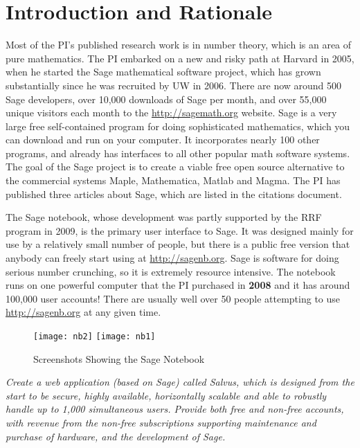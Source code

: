 \documentclass[11pt]{article}
\begin{document}
\section{Introduction and Rationale}


Most of the PI's published research work is in number theory, which is
an area of pure mathematics.  The PI embarked on a new and risky path
at Harvard in 2005, when he started the Sage mathematical software
project, which has grown substantially since he was recruited by UW in
2006.  There are now around 500 Sage developers, over 10,000 downloads
of Sage per month, and over 55,000 unique visitors each month to the
\url{http://sagemath.org} website.  Sage is a very large free
self-contained program for doing sophisticated mathematics, which you
can download and run on your computer.  It incorporates nearly 100
other programs, and already has interfaces to all other popular math
software systems.  The goal of the Sage project is to create a viable
free open source alternative to the commercial systems Maple,
Mathematica, Matlab and Magma.  The PI has published three articles
about Sage, which are listed in the citations document.

The Sage notebook, whose development was partly supported by the RRF
program in 2009, is the primary user interface to Sage.  It was
designed mainly for use by a relatively small number of people, but
there is a public free version that anybody can freely start using at
\url{http://sagenb.org}.  Sage is software for doing serious number
crunching, so it is extremely resource intensive.  The notebook runs
on one powerful computer that the PI purchased in {\bf 2008} and it
has around 100,000 user accounts!  There are usually well over 50
people attempting to use \url{http://sagenb.org} at any given time.

\begin{center}
\begin{figure}[ht]
\hfill
\texttt{[image: nb2]}
\hfill
\texttt{[image: nb1]}
\hfill
\mbox{}
\caption{Screenshots Showing the Sage Notebook\label{fig:sagenb}}
\end{figure}
\end{center}

 {\em Create a web application (based on Sage)
  called Salvus, which is designed from the start to be secure, highly
  available, horizontally scalable and able to robustly handle up to
  1,000 simultaneous users.  Provide both free and non-free accounts,
  with revenue from the non-free subscriptions supporting maintenance
  and purchase of hardware, and the development of Sage.}
\end{document}

